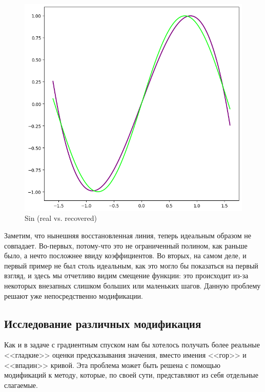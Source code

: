 \documentclass[12pt, a4paper, oneside, final]{article}
\begin{document}
	\begin{figure}[H]
		\centering
		\includegraphics[scale = 0.8]{Image/AT1_SIN.png}
		\caption*{Sin (real vs. recovered)}
	\end{figure}
	Заметим, что нынешняя восстановленная линия, теперь идеальным образом не совпадает.
	Во-первых, потому-что это не ограниченный полином, как раньше было, а нечто посложнее ввиду коэффициентов.
	Во вторых, на самом деле, и первый пример не был столь идеальным, как это могло бы показаться на первый взгляд, и здесь мы отчетливо видим смещение функции: это происходит из-за некоторых внезапных слишком больших или маленьких шагов.
	Данную проблему решают уже непосредственно модификации.
	\subsection*{Исследование различных модификация}
	Как и в задаче с градиентным спуском нам бы хотелось получать более реальные <<гладкие>> оценки предсказывания значения, вместо имения <<гор>> и <<впадин>> кривой.
	Эта проблема может быть решена с помощью модификаций к методу, которые, по своей сути, представляют из себя отдельные слагаемые.
\end{document}
